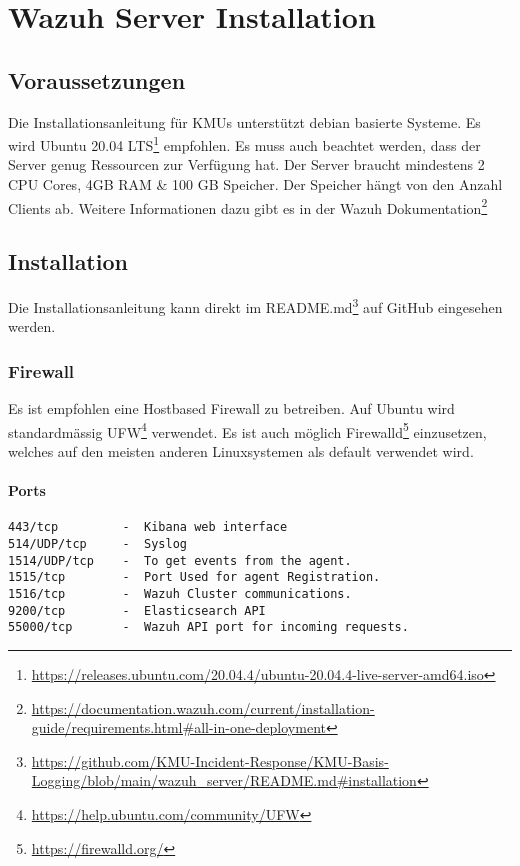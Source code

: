 \chapter{Wazuh Server Installation}

\section{Voraussetzungen}
Die Installationsanleitung für KMUs unterstützt debian basierte Systeme.
Es wird Ubuntu 20.04 LTS\footnote{\href{https://releases.ubuntu.com/20.04.4/ubuntu-20.04.4-live-server-amd64.iso}{https://releases.ubuntu.com/20.04.4/ubuntu-20.04.4-live-server-amd64.iso}} empfohlen.
Es muss auch beachtet werden, dass der Server genug Ressourcen zur Verfügung hat.
Der Server braucht mindestens 2 CPU Cores, 4GB RAM \& 100 GB Speicher.
Der Speicher hängt von den Anzahl Clients ab.
Weitere Informationen dazu gibt es in der Wazuh Dokumentation\footnote{\href{https://documentation.wazuh.com/current/installation-guide/requirements.html\#all-in-one-deployment}{https://documentation.wazuh.com/current/installation-guide/requirements.html\#all-in-one-deployment}} 

\section{Installation}
Die Installationsanleitung kann direkt im README.md\footnote{\href{https://github.com/KMU-Incident-Response/KMU-Basis-Logging/blob/main/wazuh\_server/README.md\#installation}{https://github.com/KMU-Incident-Response/KMU-Basis-Logging/blob/main/wazuh\_server/README.md\#installation}} auf GitHub eingesehen werden.


\subsection{Firewall}
Es ist empfohlen eine Hostbased Firewall zu betreiben.
Auf Ubuntu wird standardmässig UFW\footnote{\href{https://help.ubuntu.com/community/UFW}{https://help.ubuntu.com/community/UFW}} verwendet.
Es ist auch möglich Firewalld\footnote{\href{https://firewalld.org/}{https://firewalld.org/}} einzusetzen, welches auf den meisten anderen Linuxsystemen als default verwendet wird.

\subsubsection{Ports}
\begin{lstlisting}
443/tcp         -  Kibana web interface
514/UDP/tcp     -  Syslog
1514/UDP/tcp    -  To get events from the agent.
1515/tcp        -  Port Used for agent Registration.
1516/tcp        -  Wazuh Cluster communications.
9200/tcp        -  Elasticsearch API
55000/tcp       -  Wazuh API port for incoming requests.
\end{lstlisting}




